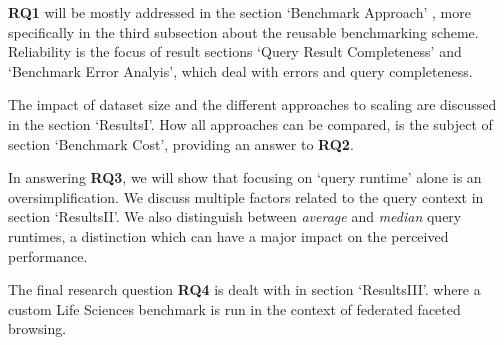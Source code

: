 \textbf{RQ1} will be mostly addressed in the section `Benchmark Approach' , more specifically in the third subsection about the reusable benchmarking scheme. Reliability is the focus of result sections `Query Result Completeness' and `Benchmark Error Analyis', 
which deal with errors and query completeness. 

The impact of dataset size and the different approaches to scaling are discussed in the section `ResultsI'.
How all approaches can be compared, is the subject of section `Benchmark Cost', %
providing an answer to \textbf{RQ2}. 

In answering \textbf{RQ3}, we will show that focusing on `query runtime' alone is an oversimplification. We discuss multiple factors related to the query context in section `ResultsII'. %
We also distinguish between \emph{average} and \emph{median} query runtimes, 
a distinction which can have a major impact on the perceived performance.

The final research question \textbf{RQ4} is dealt with in section `ResultsIII'. 
where a custom Life Sciences benchmark is run in the context of federated faceted browsing. 
